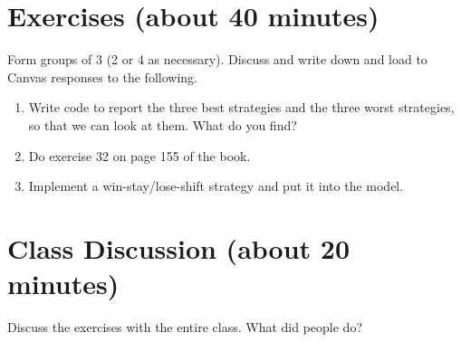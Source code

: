 \section{Exercises (about 40 minutes)}

Form groups of 3 (2 or 4 as necessary). Discuss and write down and load to Canvas responses to the following.

\begin{enumerate}
\item Write code to report the three best strategies and the three worst strategies, so that we can look at them. What do you find?
\item Do exercise 32 on page 155 of the book.

\item Implement a win-stay/lose-shift strategy and put it into the model.
\end{enumerate}

\section{Class Discussion (about 20 minutes)}

Discuss the exercises with the entire class. What did people do?





%
%
%
%
%
%
%
%
%
%
%
%
%
%


\appendix

